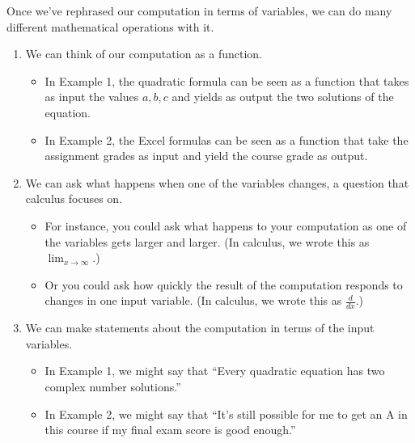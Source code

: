 \documentclass[letterpaper,10pt,english]{jupyterBook}
\begin{document}
\sphinxAtStartPar
Once we’ve rephrased our computation in terms of variables, we can do many different mathematical operations with it.
\begin{enumerate}
%
\item {} 
\sphinxAtStartPar
We can think of our computation as a function.
\begin{itemize}
\item {} 
\sphinxAtStartPar
In Example 1, the quadratic formula can be seen as a function that takes as input the values \(a,b,c\) and yields as output the two solutions of the equation.

\item {} 
\sphinxAtStartPar
In Example 2, the Excel formulas can be seen as a function that take the assignment grades as input and yield the course grade as output.

\end{itemize}

\item {} 
\sphinxAtStartPar
We can ask what happens when one of the variables changes, a question that calculus focuses on.
\begin{itemize}
\item {} 
\sphinxAtStartPar
For instance, you could ask what happens to your computation as one of the variables gets larger and larger.  (In calculus, we wrote this as \(\lim_{x\to\infty}\).)

\item {} 
\sphinxAtStartPar
Or you could ask how quickly the result of the computation responds to changes in one input variable.  (In calculus, we wrote this as \(\frac{d}{dx}\).)

\end{itemize}

\item {} 
\sphinxAtStartPar
We can make statements about the computation in terms of the input variables.
\begin{itemize}
\item {} 
\sphinxAtStartPar
In Example 1, we might say that “Every quadratic equation has two complex number solutions.”

\item {} 
\sphinxAtStartPar
In Example 2, we might say that “It’s still possible for me to get an A\sphinxhyphen{} in this course if my final exam score is good enough.”

\end{itemize}

\end{enumerate}
\end{document}
